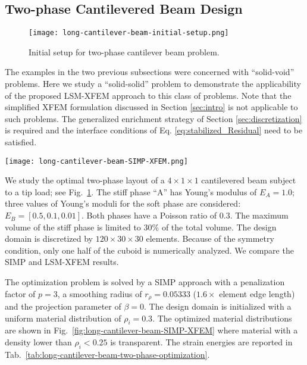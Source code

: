 \subsection{Two-phase Cantilevered Beam Design}
\label{sec:two-phase-optimization}
%
\begin{figure}
	\centering
	\texttt{[image: long-cantilever-beam-initial-setup.png]}
	\caption{Initial setup for two-phase cantilever beam problem.}
	\label{fig:long-cantilever-beam-initial-setup}
\end{figure}
%
The examples in the two previous subsections were concerned with ``solid-void'' problems. Here we study a ``solid-solid'' problem to demonstrate the applicability of the proposed LSM-XFEM approach to this class of problems. Note that the simplified XFEM formulation discussed in Section \ref{sec:intro} is not applicable to such problems. The generalized enrichment strategy of Section \ref{sec:discretization} is required and the interface conditions of Eq. \ref{eq:stabilized_Residual} need to be satisfied.
%
\begin{figure*}[t]
	\centering
	\texttt{[image: long-cantilever-beam-SIMP-XFEM.png]}
	\caption{SIMP and LSM-XFEM results for different stiffness ratios: (from left to right) $E_{B} = 0.5 E_{A}$, $E_{B} = 0.1 E_{A}$, $E_{B} = 0.01 E_{A}$, $E_{B}$ is void; SIMP results (top row); LSM-XFEM results (bottom row).}
	\label{fig:long-cantilever-beam-SIMP-XFEM}
\end{figure*}
%
We study the optimal two-phase layout of a $4 \times 1 \times 1$ cantilevered beam subject to a tip load; see Fig.~\ref{fig:long-cantilever-beam-initial-setup}. The stiff  phase ``A'' has Young's modulus of $E_A = 1.0$; three values of Young's moduli for the soft phase are considered:  $E_B = [0.5, 0.1, 0.01]$. Both phases have a Poisson ratio of $0.3$. The maximum volume of the stiff phase is limited to $30 \%$ of the total volume. The design domain is discretized by $120 \times 30 \times 30$ elements. Because of the symmetry condition, only one half of the cuboid is numerically analyzed. We compare the SIMP and LSM-XFEM results.

The optimization problem is solved by a SIMP approach with a penalization factor of $p=3$, a smoothing radius of $r_{\rho} = 0.05333$ ($1.6 \times$ element edge length) and the projection parameter of $\beta=0$. The design domain is initialized with a uniform material distribution of $\rho_i = 0.3$.  The optimized material distributions are shown in Fig.~\ref{fig:long-cantilever-beam-SIMP-XFEM} where material with a density lower than $\rho_i < 0.25$ is transparent. The strain energies are reported in Tab.~\ref{tab:long-cantilever-beam-two-phase-optimization}.

